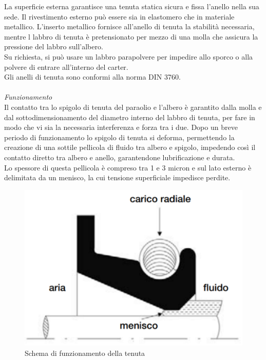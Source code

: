 La superficie esterna garantisce una tenuta statica sicura e fissa l'anello nella sua sede. Il rivestimento esterno può essere sia in elastomero che in materiale metallico. L'inserto metallico fornisce all’anello di tenuta la stabilità necessaria, mentre l labbro di tenuta è pretensionato per mezzo di una molla che assicura la pressione del labbro sull'albero. \\
Su richiesta, si può usare un labbro parapolvere per impedire allo sporco o alla polvere di entrare all'interno del carter.\\
Gli anelli di tenuta sono conformi alla norma DIN 3760. \\
\\
\emph{Funzionamento}\\
Il contatto tra lo spigolo di tenuta del paraolio e l’albero è garantito dalla molla e dal sottodimensionamento del diametro interno del labbro di tenuta, per fare in modo che vi sia la necessaria interferenza e forza tra i due. Dopo un breve periodo di funzionamento lo spigolo di tenuta si deforma, permettendo la creazione di una sottile pellicola di fluido tra albero e spigolo, impedendo così il contatto diretto tra albero e anello, garantendone lubrificazione e durata. \\
Lo spessore di questa pellicola è compreso tra 1 e 3 micron e sul lato esterno è delimitata da un menisco, la cui tensione superficiale impedisce perdite.
\newpage
\begin{figure}[h]
    \centering
    \includegraphics[scale=0.6]{Immagini/FunzionamentoParaolio1.png}
    \caption{Schema di funzionamento della tenuta}
    \label{fig:FunzionamentoParaolio1}
\end{figure}

